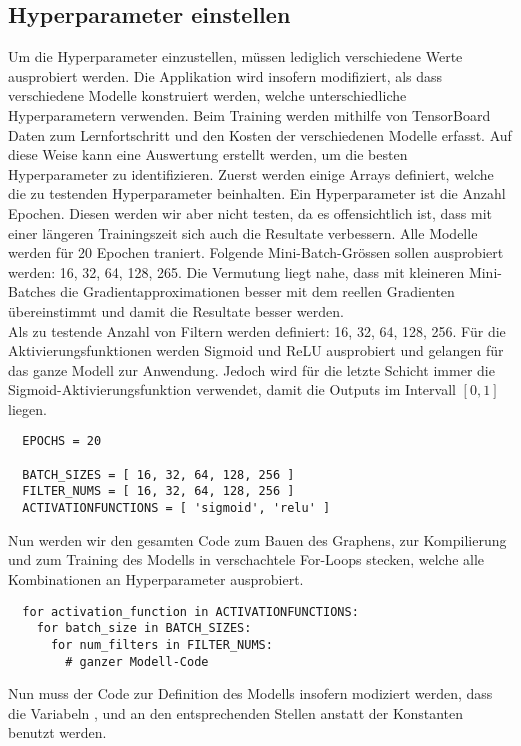 \subsection{Hyperparameter einstellen}
Um die Hyperparameter einzustellen, müssen lediglich verschiedene Werte
ausprobiert werden. Die Applikation wird insofern modifiziert, als dass
verschiedene Modelle konstruiert werden, welche unterschiedliche
Hyperparametern verwenden.
Beim Training werden mithilfe von TensorBoard
Daten zum Lernfortschritt und den Kosten der verschiedenen Modelle erfasst. Auf
diese Weise kann eine Auswertung erstellt werden, um die besten Hyperparameter
zu identifizieren.
\para{}
Zuerst werden einige Arrays definiert, welche die zu testenden Hyperparameter beinhalten.
Ein Hyperparameter ist die Anzahl Epochen. Diesen werden wir aber nicht testen,
da es offensichtlich ist, dass mit einer längeren Trainingszeit sich auch die
Resultate verbessern.
Alle Modelle werden für 20 Epochen traniert.
\para{}
Folgende Mini-Batch-Grössen sollen ausprobiert werden: 16, 32, 64, 128, 265.
Die Vermutung liegt nahe, dass mit kleineren Mini-Batches die
Gradientapproximationen besser mit dem reellen Gradienten übereinstimmt und
damit die Resultate besser werden. \\
Als zu testende Anzahl von Filtern werden definiert: 16, 32, 64, 128, 256.
Für die Aktivierungsfunktionen werden Sigmoid und ReLU ausprobiert und gelangen
für das ganze Modell zur Anwendung.
Jedoch wird für die letzte Schicht immer die
Sigmoid-Aktivierungsfunktion verwendet, damit die Outputs im Intervall $[0,1]$
liegen.

\begin{verbatim}
  EPOCHS = 20

  BATCH_SIZES = [ 16, 32, 64, 128, 256 ]
  FILTER_NUMS = [ 16, 32, 64, 128, 256 ]
  ACTIVATIONFUNCTIONS = [ 'sigmoid', 'relu' ]
\end{verbatim}
Nun werden wir den gesamten Code zum Bauen des Graphens, zur Kompilierung und
zum Training des Modells in verschachtele For-Loops stecken, welche alle
Kombinationen an Hyperparameter ausprobiert.

\begin{verbatim}
  for activation_function in ACTIVATIONFUNCTIONS:
    for batch_size in BATCH_SIZES:
      for num_filters in FILTER_NUMS:
        # ganzer Modell-Code
\end{verbatim}
Nun muss der Code zur Definition des Modells insofern modiziert werden, dass
die Variabeln ,  und
 an den entsprechenden Stellen anstatt der Konstanten benutzt werden.

